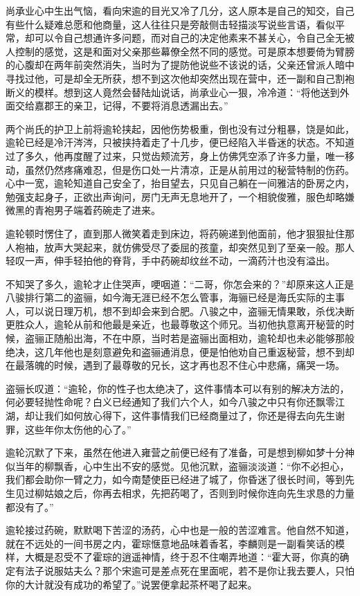 尚承业心中生出气恼，看向宋逾的目光又冷了几分，这人原本是自己的知交，自己有些什么疑难总愿和他商量，这人往往只是旁敲侧击轻描淡写说些言语，看似平常，却可以令自己想通许多问题，而对自己的决定他素来不甚关心，令自己全无被人控制的感觉，这是和面对父亲那些幕僚全然不同的感觉。可是原本想要倚为臂膀的心腹却在两年前突然消失，当时为了提防他说些不该说的话，父亲还曾派人暗中寻找过他，可是却全无所获，想不到这次他却突然出现在营中，还一副和自己割袍断义的模样。想到这人竟然会替陆灿说话，尚承业心一狠，冷冷道：“将他送到外面交给嘉郡王的亲卫，记得，不要将消息透漏出去。”

两个尚氏的护卫上前将逾轮挟起，因他伤势极重，倒也没有过分粗暴，饶是如此，逾轮已经是冷汗涔涔，只被挟持着走了十几步，便已经陷入半昏迷的状态。不知道过了多久，他再度醒了过来，只觉齿颊流芳，身上仿佛凭空添了许多力量，唯一移动，虽然仍然疼痛难忍，但是伤口处一片清凉，正是从前用过的秘营特制的伤药。心中一宽，逾轮知道自己安全了，抬目望去，只见自己躺在一间雅洁的卧房之内，勉强支起身子，正欲出声询问，房门无声无息地开了，一个相貌俊雅，服色却略嫌微黑的青袍男子端着药碗走了进来。

逾轮顿时愣住了，直到那人微笑着走到床边，将药碗递到他面前，他才狠狠扯住那人袍袖，放声大哭起来，就仿佛受尽了委屈的孩童，却突然见到了至亲一般。那人轻叹一声，伸手轻拍他的脊背，手中药碗却纹丝不动，一滴药汁也没有溢出。

不知哭了多久，逾轮才止住哭声，哽咽道：“二哥，你怎会来的？”却原来这人正是八骏排行第二的盗骊，如今海无涯已经不怎么管事，海骊已经是海氏实际的主事人，可以说日理万机，想不到却会来到合肥。八骏之中，盗骊无情果敢，杀伐决断更胜众人，逾轮从前和他最是亲近，也最尊敬这个师兄。当初他执意离开秘营的时候，盗骊正随船出海，不在中原，当时若是盗骊出面相劝，逾轮却也未必能够那般绝决，这几年他也是刻意避免和盗骊通消息，便是怕他劝自己重返秘营，想不到却在最落魄的时候，遇到了最尊敬的兄长，这才再也忍不住心中悲痛，痛哭一场。

盗骊长叹道：“逾轮，你的性子也太绝决了，这件事情本可以有别的解决方法的，何必要轻抛性命呢？白义已经通知了我们六个人，如今八骏之中只有你还飘零江湖，却让我们如何放心得下，这件事情我们已经商量过了，你还是得去向先生谢罪，这些年你太伤他的心了。”

逾轮沉默了下来，虽然在他进入雍营之前便已经有了准备，可是想到柳如梦十分神似当年的柳飘香，心中生出不安的感觉。见他沉默，盗骊淡淡道：“你不必担心，我们都会助你一臂之力，如今南楚使臣已经进了城了，你昏迷了很长时间，等到先生见过柳姑娘之后，你再去相求，先把药喝了，否则到时候你连向先生求恳的力量都没有了。”

逾轮接过药碗，默默喝下苦涩的汤药，心中也是一般的苦涩难言。他自然不知道，就在不远处的一间书房之内，霍琮惬意地品味着香茗，李麟则是一副看笑话的模样，大概是忍受不了霍琮的逍遥神情，终于忍不住嘲弄地道：“霍大哥，你真的确定有法子说服姑夫么？那个宋逾可是差点死在里面呢，若不是你让我去要人，只怕你的大计就没有成功的希望了。”说罢便拿起茶杯喝了起来。

